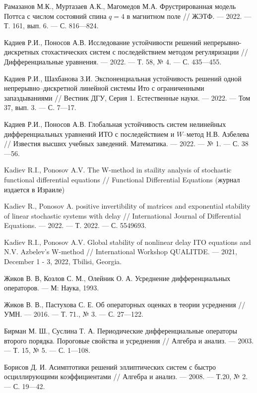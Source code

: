 \begin{thebibliography}{111}
Рамазанов М.К., Муртазаев А.К., Магомедов М.А.
Фрустрированная модель Поттса с числом состояний спина $q = 4$ в магнитном поле
//
ЖЭТФ.
--- 2022.
--- Т. 161, вып. 6.
--- С. 816---824.



Кадиев Р.И., Поносов А.В.
Исследование устойчивости решений непрерывно-дискретных стохастических систем с последействием методом регуляризации
//
Дифференциальные уравнения.
--- 2022.
--- Т. 58, № 4.
--- С. 435---455.

Кадиев Р.И., Шахбанова З.И.
Экспоненциальная устойчивость решений одной непрерывно--дискретной линейной системы Ито с ограниченными запаздываниями
//
Вестник ДГУ, Серия 1. Естественные науки.
--- 2022.
--- Том 37, вып. 3.
--- С. 7---17.

Кадиев Р.И., Поносов А.В.
Глобальная устойчивость систем нелинейных дифференциальных уравнений ИТО с последействием и $W$--метод Н.В. Азбелева
//
Известия высших учебных заведений. Математика.
--- 2022.
--- № 1.
--- С. 38---56.

Kadiev R.I., Ponosov A.V.
The W-method in staility analysis of stochastic functional differential equations
//
Functional Differential Equations
(журнал издается в Израиле)

Kadiev R., Ponosov A. positive invertibility of matrices and
exponential stability of linear stochastic systems with delay
//
International Journal of Differential Equations.
--- 2022.
--- Т. 2022.
--- С. 5549693.

Kadiev R.I., Ponosov A.V.
Global stability of nonlinear delay ITO equations and N.V. Azbelev's W-method
//
International Workshop QUALITDE.
--- 2021, December 1 - 3, 2022, Tbilisi, Georgia.


  Жиков В. В, Козлов С. М., Олейник О. А. Усреднение дифференциальных операторов. --- М: Наука, 1993.

  Жиков В. В., Пастухова С. Е. Об операторных оценках в теории усреднения // УМН. --- 2016. --- Т. 71., № 3. --- С. 27---122.

  Бирман М. Ш., Суслина Т. А. Периодические дифференциальные операторы второго порядка. Пороговые свойства  и усреднения // Алгебра  и  анализ. --- 2003. --- Т. 15, № 5. --- С. 1---108.

  Борисов Д. И. Асимптотики решений эллиптических систем с быстро осциллирующими коэффициентами // Алгебра и анализ. --- 2008. --- Т.20, № 2. --- С. 19---42.


\end{thebibliography}
